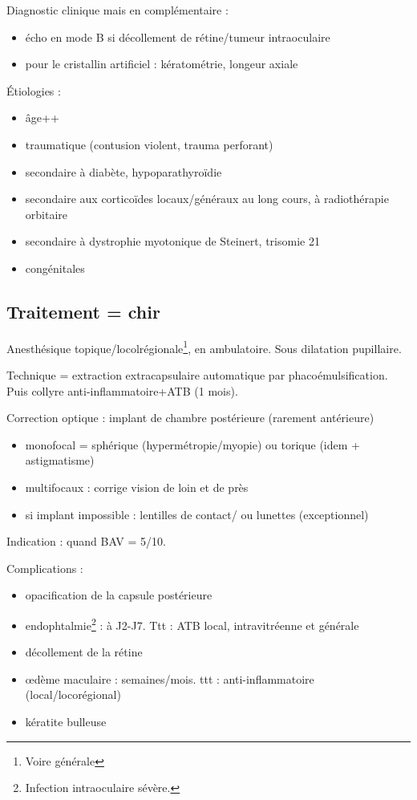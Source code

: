 \documentclass[11pt]{article}
\begin{document}
Diagnostic clinique mais en complémentaire :
\begin{itemize}
\item écho en mode B si décollement de rétine/tumeur intraoculaire
\item pour le cristallin artificiel : kératométrie, longeur axiale
\end{itemize}

Étiologies :
\begin{itemize}
\item âge++
\item traumatique (contusion violent, trauma perforant)
\item secondaire à diabète, hypoparathyroïdie
\item secondaire aux corticoïdes locaux/généraux au long cours, à radiothérapie
orbitaire
\item secondaire à dystrophie myotonique de Steinert, trisomie 21
\item congénitales
\end{itemize}

\subsection{Traitement = chir}
\label{sec:org158602b}
Anesthésique topique/locolrégionale\footnote{Voire générale}, en ambulatoire. Sous dilatation
pupillaire. 

Technique = extraction extracapsulaire automatique par phacoémulsification. Puis
collyre anti-inflammatoire+ATB (1 mois).

Correction optique : implant de chambre postérieure (rarement antérieure)
\begin{itemize}
\item monofocal = sphérique (hypermétropie/myopie) ou torique (idem + astigmatisme)
\item multifocaux : corrige vision de loin et de près
\item si implant impossible : lentilles de contact/ ou lunettes (exceptionnel)
\end{itemize}

Indication : quand BAV = 5/10.

Complications :
\begin{itemize}
\item opacification de la capsule postérieure
\item endophtalmie\footnote{Infection intraoculaire sévère.} : à J2-J7. Ttt : ATB local, intravitréenne et générale
\item décollement de la rétine
\item \oe{}dème maculaire : semaines/mois. ttt : anti-inflammatoire
(local/locorégional)
\item kératite bulleuse
\end{itemize}
\end{document}
